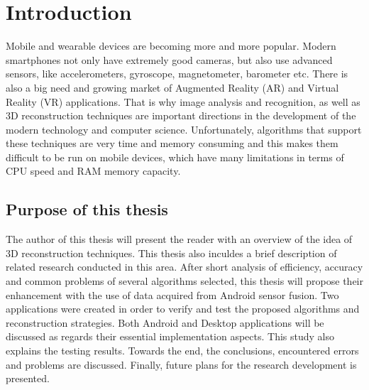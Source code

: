 
\chapter{Introduction}
\ifpdf
    \graphicspath{{1_introduction/figures/PNG/}{1_introduction/figures/PDF/}{1_introduction/figures/}}
\else
    \graphicspath{{1_introduction/figures/EPS/}{1_introduction/figures/}}
\fi


Mobile and wearable devices are becoming more and more popular. Modern smartphones not only have extremely good cameras, but also use advanced sensors, like accelerometers, gyroscope, magnetometer, barometer etc. There is also a big need and growing market of Augmented Reality (AR) and Virtual Reality (VR) applications. That is why image analysis and recognition, as well as 3D reconstruction techniques are important directions in the development of the modern technology and computer science. Unfortunately, algorithms that support these techniques are very time and memory consuming and this makes them difficult to be run on mobile devices, which have many limitations in terms of CPU speed and RAM memory capacity.

\section{Purpose of this thesis} %
The author of this thesis will present the reader with an overview of the idea of 3D reconstruction techniques. This thesis also inculdes a brief description of related research conducted in this area. After short analysis of efficiency, accuracy and common problems of several algorithms selected, this thesis will propose their enhancement with the use of data acquired from Android sensor fusion. Two applications were created in order to verify and test the proposed algorithms and reconstruction strategies. Both Android and Desktop applications will be discussed as regards their essential implementation aspects. This study also explains the testing results. Towards the end, the conclusions, encountered errors and problems are discussed. Finally, future plans for the research development is presented.
